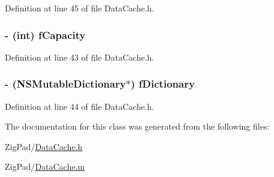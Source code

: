 Definition at line 45 of file DataCache.h.

\hypertarget{interface_data_cache_af27c42bd9600a5c9935ce169048c1f29}{
\subsubsection[{fCapacity}]{\setlength{\rightskip}{0pt plus 5cm}-\/ (int) {\bf fCapacity}}}
\label{interface_data_cache_af27c42bd9600a5c9935ce169048c1f29}


Definition at line 43 of file DataCache.h.

\hypertarget{interface_data_cache_a33188f8093fc0f16aa619a76d2963dca}{
\subsubsection[{fDictionary}]{\setlength{\rightskip}{0pt plus 5cm}-\/ (NSMutableDictionary$\ast$) {\bf fDictionary}}}
\label{interface_data_cache_a33188f8093fc0f16aa619a76d2963dca}


Definition at line 44 of file DataCache.h.



The documentation for this class was generated from the following files:\begin{DoxyCompactItemize}
\item 
ZigPad/\hyperlink{_data_cache_8h}{DataCache.h}\item 
ZigPad/\hyperlink{_data_cache_8m}{DataCache.m}\end{DoxyCompactItemize}
